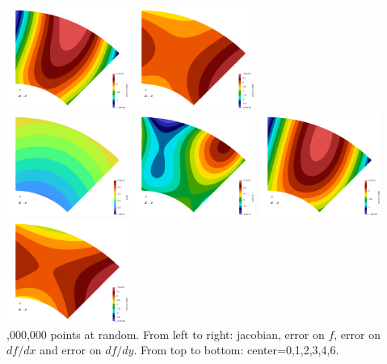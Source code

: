 \begin{center}
\includegraphics[width=4cm]{images/mappings/biquadratic3/elt4/dfdx.0004.png}
\includegraphics[width=4cm]{images/mappings/biquadratic3/elt4/dfdy.0004.png}\\
\includegraphics[width=4cm]{images/mappings/biquadratic3/elt4/jcob.0005.png}
\includegraphics[width=4cm]{images/mappings/biquadratic3/elt4/f.0005.png}
\includegraphics[width=4cm]{images/mappings/biquadratic3/elt4/dfdx.0005.png}
\includegraphics[width=4cm]{images/mappings/biquadratic3/elt4/dfdy.0005.png}\\
{,000,000 points at random. From left to right: jacobian, 
error on $f$, error on $df/dx$ and error on $df/dy$. From top
to bottom: center=0,1,2,3,4,6.} 
\end{center}



